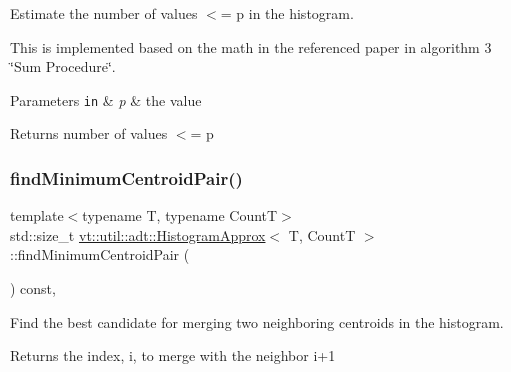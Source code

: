 Estimate the number of values $<$= p in the histogram. 

This is implemented based on the math in the referenced paper in algorithm 3 \char`\"{}\+Sum Procedure\char`\"{}.


\begin{DoxyParams}[1]{Parameters}
\mbox{\tt in}  & {\em p} & the value\\
\hline
\end{DoxyParams}
\begin{DoxyReturn}{Returns}
number of values $<$= p 
\end{DoxyReturn}
\mbox{\label{structvt_1_1util_1_1adt_1_1_histogram_approx_a0bba7a9d03149be996f45bfe245abd03}} 
\subsubsection{\texorpdfstring{find\+Minimum\+Centroid\+Pair()}{findMinimumCentroidPair()}}
{\footnotesize\ttfamily template$<$typename T, typename CountT$>$ \\
std\+::size\+\_\+t \hyperlink{structvt_1_1util_1_1adt_1_1_histogram_approx}{vt\+::util\+::adt\+::\+Histogram\+Approx}$<$ T, CountT $>$\+::find\+Minimum\+Centroid\+Pair (\begin{DoxyParamCaption}{ }\end{DoxyParamCaption}) const\hspace{0.3cm}{\ttfamily [inline]}, {\ttfamily [private]}}



Find the best candidate for merging two neighboring centroids in the histogram. 

\begin{DoxyReturn}{Returns}
the index, {\ttfamily i}, to merge with the neighbor {\ttfamily i+1} 
\end{DoxyReturn}
\mbox{\label{structvt_1_1util_1_1adt_1_1_histogram_approx_ac376fd975845204cca3425c8517376f6}} 
